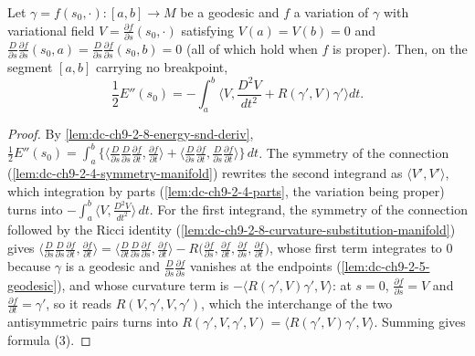 \begin{lemma}
  \label{lem:dc-ch9-2-8-segment}
  \leanok
  Let $\gamma=f(s_0,\cdot):[a,b]\to M$ be a geodesic and $f$ a variation of $\gamma$ with
  variational field $V=\frac{\partial f}{\partial s}(s_0,\cdot)$ satisfying $V(a)=V(b)=0$ and
  $\frac{D}{\partial s}\frac{\partial f}{\partial s}(s_0,a)
    =\frac{D}{\partial s}\frac{\partial f}{\partial s}(s_0,b)=0$ (all of which hold when $f$ is
  proper). Then, on the segment $[a,b]$ carrying no breakpoint,
  $$
  \frac{1}{2}E''(s_0)=-\int_a^b\Big\langle V,\frac{D^2 V}{dt^2}+R(\gamma',V)\gamma'\Big\rangle dt .
  $$

\end{lemma}
\begin{proof}
  \leanok
  \sketch
  By \cref{lem:dc-ch9-2-8-energy-snd-deriv},
  $\frac12 E''(s_0)=\int_a^b\{\langle\frac{D}{\partial s}\frac{D}{\partial s}\frac{\partial f}{\partial t},\frac{\partial f}{\partial t}\rangle+\langle\frac{D}{\partial s}\frac{\partial f}{\partial t},\frac{D}{\partial s}\frac{\partial f}{\partial t}\rangle\}\,dt$.
  The symmetry of the connection (\cref{lem:dc-ch9-2-4-symmetry-manifold}) rewrites the second
  integrand as $\langle V',V'\rangle$, which integration by parts
  (\cref{lem:dc-ch9-2-4-parts}, the variation being proper) turns into
  $-\int_a^b\langle V,\frac{D^2V}{dt^2}\rangle\,dt$. For the first integrand, the symmetry of
  the connection followed by the Ricci identity
  (\cref{lem:dc-ch9-2-8-curvature-substitution-manifold}) gives
  $\langle\frac{D}{\partial s}\frac{D}{\partial s}\frac{\partial f}{\partial t},\frac{\partial f}{\partial t}\rangle
    =\langle\frac{D}{\partial t}\frac{D}{\partial s}\frac{\partial f}{\partial s},\frac{\partial f}{\partial t}\rangle
     -R\big(\tfrac{\partial f}{\partial s},\tfrac{\partial f}{\partial t},\tfrac{\partial f}{\partial s},\tfrac{\partial f}{\partial t}\big)$,
  whose first term integrates to $0$ because $\gamma$ is a geodesic and
  $\frac{D}{\partial s}\frac{\partial f}{\partial s}$ vanishes at the endpoints
  (\cref{lem:dc-ch9-2-5-geodesic}), and whose curvature term is $-\langle R(\gamma',V)\gamma',V\rangle$:
  at $s=0$, $\frac{\partial f}{\partial s}=V$ and $\frac{\partial f}{\partial t}=\gamma'$, so it reads
  $R(V,\gamma',V,\gamma')$, which the interchange of the two antisymmetric pairs turns into
  $R(\gamma',V,\gamma',V)=\langle R(\gamma',V)\gamma',V\rangle$.
  Summing gives formula (3).
\end{proof}
